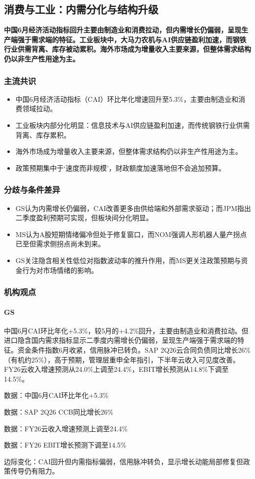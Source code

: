 \documentclass[11pt]{ctexart}
\begin{document}
\subsection{消费与工业：内需分化与结构升级}
\textbf{中国6月经济活动指标回升主要由制造业和消费拉动，但内需增长仍偏弱，呈现生产端强于需求端的特征。工业板块中，大马力农机与AI供应链盈利加速，而钢铁行业供需背离、库存被动累积。海外市场成为增量收入主要来源，但整体需求结构仍以非生产性用途为主。}
\subsubsection*{主流共识}
\begin{itemize}
  \item 中国6月经济活动指标（CAI）环比年化增速回升至5.3\%，主要由制造业和消费领域拉动。
  \item 工业板块内部分化明显：信息技术与AI供应链盈利加速，而传统钢铁行业供需背离、库存累积。
  \item 海外市场成为增量收入主要来源，但整体需求结构仍以非生产性用途为主。
  \item 政策预期集中于‘速度而非规模’，财政额度加速落地但不会追加预算。
\end{itemize}
\subsubsection*{分歧与条件差异}
\begin{itemize}
  \item GS认为内需增长仍偏弱，CAI改善更多由供给端和外部需求驱动；而JPM指出二季度盈利预期可实现，但板块间分化明显。
  \item MS认为A股短期情绪偏冷但处于修复窗口，而NOM强调人形机器人量产拐点已至但需求侧拐点尚未到来。
  \item GS关注隐含相关性低位对指数波动率的推升作用，而MS更关注政策预期与资金行为对市场情绪的影响。
\end{itemize}
\subsubsection*{机构观点}
\paragraph{GS} 中国6月CAI环比年化+5.3\%，较5月的+4.2\%回升，主要由制造业和消费拉动。但进口隐含国内需求指标显示二季度内需增长仍偏弱，呈现生产端强于需求端的特征。资金条件指数6月收紧，信用脉冲已转负。SAP 2Q26云合同负债同比增长26\%（有机约25\%），高于预期，管理层重申全年指引，下半年云收入可见度改善。FY26云收入增速预测从24.0\%上调至24.4\%，EBIT增长预测从14.8\%下调至14.5\%。
{\small\color{refgray}数据：中国6月CAI环比年化+5.3\%\par}
{\small\color{refgray}数据：SAP 2Q26 CCB同比增长26\%\par}
{\small\color{refgray}数据：FY26云收入增速预测上调至24.4\%\par}
{\small\color{refgray}数据：FY26 EBIT增长预测下调至14.5\%\par}
{\small\color{refgray}边际变化：CAI回升但内需指标偏弱，信用脉冲转负，显示增长动能局部修复但政策传导仍有阻力。\par}
\end{document}
